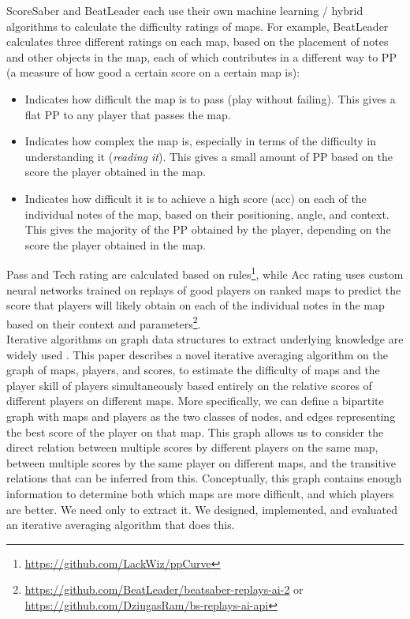 \documentclass[12pt,a4paper]{article}
\begin{document}
ScoreSaber and BeatLeader each use their own machine learning / hybrid algorithms to calculate the difficulty ratings of maps. For example, BeatLeader calculates three different ratings on each map, based on the placement of notes and other objects in the map, each of which contributes in a different way to PP (a measure of how good a certain score on a certain map is):

\begin{itemize}

\item {} Indicates how difficult the map is to pass (play without failing). This gives a flat PP to any player that passes the map.
\item {} Indicates how complex the map is, especially in terms of the difficulty in understanding it ({\emph{reading it}}). This gives a small amount of PP based on the score the player obtained in the map.
\item {} Indicates how difficult it is to achieve a high score (acc) on each of the individual notes of the map, based on their positioning, angle, and context. This gives the majority of the PP obtained by the player, depending on the score the player obtained in the map.

\end{itemize}

Pass and Tech rating are calculated based on rules\footnote{\url{https://github.com/LackWiz/ppCurve}}, while Acc rating uses custom neural networks trained on replays of good players on ranked maps to predict the score that players will likely obtain on each of the individual notes in the map based on their context and parameters\footnote{\url{https://github.com/BeatLeader/beatsaber-replays-ai-2} or \url{https://github.com/DziugasRam/bs-replays-ai-api}}.\\

Iterative algorithms on graph data structures to extract underlying knowledge are widely used \cite{survey_distributed_graph_pattern_matching, survey_distributed_graph_algorithms}. This paper describes a novel iterative averaging algorithm on the graph of maps, players, and scores, to estimate the difficulty of maps and the player skill of players simultaneously based entirely on the relative scores of different players on different maps. More specifically, we can define a bipartite graph with maps and players as the two classes of nodes, and edges representing the best score of the player on that map. This graph allows us to consider the direct relation between multiple scores by different players on the same map, between multiple scores by the same player on different maps, and the transitive relations that can be inferred from this. Conceptually, this graph contains enough information to determine both which maps are more difficult, and which players are better. We need only to extract it. We designed, implemented, and evaluated an iterative averaging algorithm that does this.\\
\end{document}
